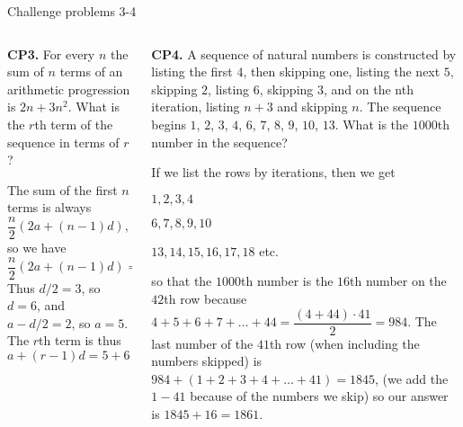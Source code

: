 \documentclass[9pt,aspectratio=169]{beamer}
\begin{document}
\begin{frame}{Challenge problems 3-4}
  \begin{columns}[T]
    \begin{column}{0.5\textwidth}
      \begin{problem}
        \textbf{CP3.} For every $n$ the sum of $n$ terms of an arithmetic progression is $2n + 3n^2$. What is the $r$th term of
        the sequence in terms of $r$?
      \end{problem}
      The sum of the first $n$ terms is always $\dfrac{n}{2} (2a + (n-1)d)$, so we have 
      \[ \frac{n}{2}(2a + (n-1)d)=an + dn^2/2 -dn/2. \]
      Thus $d/2 = 3$, so $d = 6$, and $a-d/2 = 2$, so $a=5$. The $r$th term is thus
      \[ a + (r-1)d = 5+6(r-1)=\boxed{6r-1}. \]
    \end{column}
    \begin{column}{0.5\textwidth}
      \begin{problem}
        \textbf{CP4.} A sequence of natural numbers is constructed by listing the first
        $4$, then skipping one, listing the next $5$, skipping $2$, listing $6$, skipping $3$, and on the nth
        iteration, listing $n + 3$ and skipping $n$. The sequence begins $1$, $2$, $3$, $4$, $6$, $7$, $8$, $9$, $10$, $13$.
        What is the $1000$th number in the sequence?
      \end{problem}
      If we list the rows by iterations, then we get

      $1,2,3,4$

      $6,7,8,9,10$

      $13,14,15,16,17,18$ etc.

      so that the $1000$th number is the $16$th number on the $42$th row because $4+5+6+7+\dots+44 = \dfrac{(4+44)\cdot 41}{2}=984$. The last number of the $41$th row (when including the numbers skipped) is $984 + (1+2+3+4+\dots+41)= 1845$, (we add the $1-41$ because of the numbers we skip) so our answer is $1845 + 16 = \boxed{1861}$.
    \end{column}
  \end{columns}
\end{frame}

\end{document}
